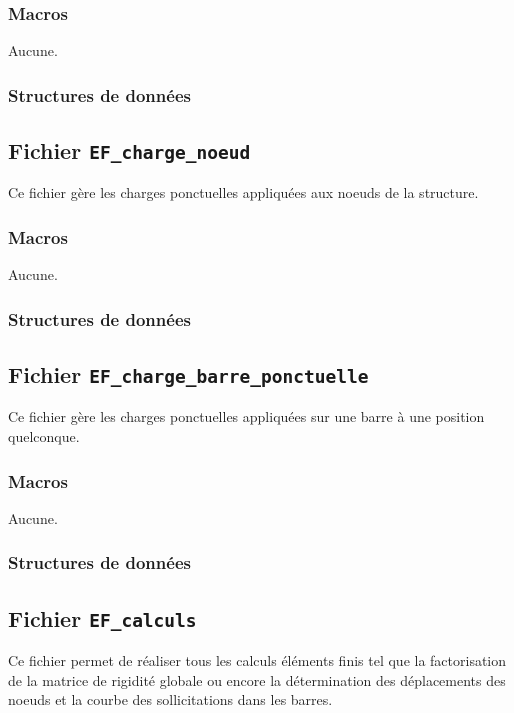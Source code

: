\documentclass{article}
\begin{document}
\subsubsection{Macros}
Aucune.
\subsubsection{Structures de données}










\subsection{Fichier {\texttt{EF\_charge\_noeud}}}
Ce fichier gère les charges ponctuelles appliquées aux noeuds de la structure.
\subsubsection{Macros}
Aucune.
\subsubsection{Structures de données}




\subsection{Fichier {\texttt{EF\_charge\_barre\_ponctuelle}}}
Ce fichier gère les charges ponctuelles appliquées sur une barre à une position quelconque.
\subsubsection{Macros}
Aucune.
\subsubsection{Structures de données}



\subsection{Fichier {\texttt{EF\_calculs}}}
Ce fichier permet de réaliser tous les calculs éléments finis tel que la factorisation de la matrice de rigidité globale ou encore la détermination des déplacements des noeuds et la courbe des sollicitations dans les barres.
\end{document}
